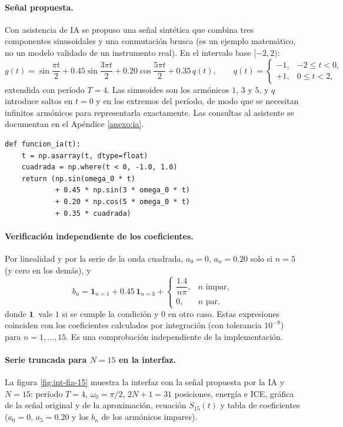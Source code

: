 \documentclass[11pt]{article}
\begin{document}
\paragraph{Señal propuesta.}
Con asistencia de IA se propuso una señal sintética que combina tres componentes sinusoidales y una conmutación brusca
(es un ejemplo matemático, no un modelo validado de un instrumento real). En el intervalo base $[-2,2)$:
\begin{equation}
 g(t)=\sin\frac{\pi t}{2}+0.45\sin\frac{3\pi t}{2}+0.20\cos\frac{5\pi t}{2}+0.35\,q(t),\qquad
 q(t)=\begin{cases}-1,&-2\le t<0,\\ +1,&0\le t<2,\end{cases}
\end{equation}
extendida con período $T=4$. Las sinusoides son los armónicos $1$, $3$ y $5$, y $q$ introduce saltos en $t=0$ y en los
extremos del período, de modo que se necesitan infinitos armónicos para representarla exactamente. Las consultas
al asistente se documentan en el Apéndice \ref{anexo:ia}.

\begin{lstlisting}
def funcion_ia(t):
    t = np.asarray(t, dtype=float)
    cuadrada = np.where(t < 0, -1.0, 1.0)
    return (np.sin(omega_0 * t)
            + 0.45 * np.sin(3 * omega_0 * t)
            + 0.20 * np.cos(5 * omega_0 * t)
            + 0.35 * cuadrada)
\end{lstlisting}

\paragraph{Verificación independiente de los coeficientes.}
Por linealidad y por la serie de la onda cuadrada, $a_0=0$, $a_n=0.20$ solo si $n=5$ (y cero en los demás), y
\[
 b_n=\mathbf 1_{n=1}+0.45\,\mathbf 1_{n=3}+\begin{cases}\dfrac{1.4}{n\pi},&n\text{ impar},\\[2mm]0,&n\text{ par},\end{cases}
\]
donde $\mathbf 1_{\cdot}$ vale $1$ si se cumple la condición y $0$ en otro caso. Estas expresiones coinciden con los
coeficientes calculados por integración (con tolerancia $10^{-9}$) para $n=1,\dots,15$. Es una comprobación independiente
de la implementación.

\paragraph{Serie truncada para $N=15$ en la interfaz.}
La figura \ref{fig:int-fia-15} muestra la interfaz con la señal propuesta por la IA y $N=15$: período $T=4$, $\omega_0=\pi/2$,
$2N+1=31$ posiciones, energía e ICE, gráfica de la señal original y de la aproximación, ecuación $S_{15}(t)$ y tabla de
coeficientes ($a_0=0$, $a_5=0.20$ y los $b_n$ de los armónicos impares).
\end{document}
